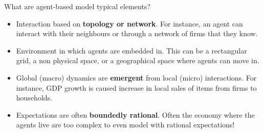 \documentclass[9pt]{beamer}
\begin{document}
\begin{frame}{What are agent-based model typical elements?}
{\begin{itemize}
        \item Interaction based on \textbf{topology or network}. For instance, an agent can interact with their neighbours or through a network of firms that they know.
        \item Environment in which agents are embedded in. This can be a rectangular grid, a non physical space, or a geographical space where agents can move in.
        \item Global (macro) dynamics are \textbf{emergent} from local (micro) interactions. For instance, GDP growth is caused increase in local sales of items from firms to households.
        \item Expectations are often \textbf{boundedly rational}. Often the economy where the agents live are too complex to even model with rational expectations!
\end{itemize}}
\end{frame}
\end{document}
